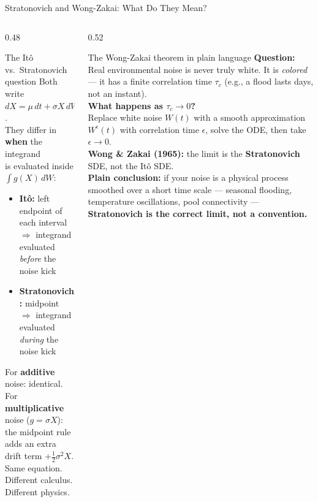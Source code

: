 \documentclass{beamer}
\newcommand{\half}{\tfrac{1}{2}}
\begin{document}
\begin{frame}{Stratonovich and Wong-Zakai: What Do They Mean?}
  \tiny

  \begin{columns}[T]

    \begin{column}{0.48\textwidth}
      \begin{block}{The It\^{o} vs.\ Stratonovich question}
        Both write $dX = \mu\,dt + \sigma X\,dW$.\\[6pt]
        They differ in \textbf{when} the integrand\\
        is evaluated inside $\int g(X)\,dW$:
        \begin{itemize}
          \item \textbf{It\^{o}:} left endpoint of each interval\\
                $\Rightarrow$ integrand evaluated \emph{before} the noise kick
          \item \textbf{Stratonovich:} midpoint\\
                $\Rightarrow$ integrand evaluated \emph{during} the noise kick
        \end{itemize}
        \vspace{0.2cm}
        For \textbf{additive} noise: identical.\\
        For \textbf{multiplicative} noise ($g = \sigma X$):\\
        the midpoint rule adds an extra drift term $+\half\sigma^2 X$.\\[4pt]
        \textcolor{alertred}{Same equation. Different calculus. Different physics.}
      \end{block}
    \end{column}

    \begin{column}{0.52\textwidth}
      \begin{block}{The Wong-Zakai theorem in plain language}
        \textbf{Question:} Real environmental noise is never
        truly white. It is \emph{colored} --- it has a
        finite correlation time $\tau_c$ (e.g., a flood
        lasts days, not an instant).\\[6pt]
        \textbf{What happens as $\tau_c \to 0$?}\\[4pt]
        Replace white noise $W(t)$ with a smooth
        approximation $W^\epsilon(t)$ with correlation
        time $\epsilon$, solve the ODE, then take
        $\epsilon \to 0$.\\[6pt]
        \textbf{Wong \& Zakai (1965):} the limit is the
        \textbf{Stratonovich} SDE, not the It\^{o} SDE.\\[6pt]
        \textbf{Plain conclusion:} if your noise is a
        physical process smoothed over a short time
        scale --- seasonal flooding, temperature
        oscillations, pool connectivity ---
        \textcolor{alertred}{\textbf{Stratonovich is the
        correct limit, not a convention.}}
      \end{block}
    \end{column}


\end{columns}
\end{frame}
\end{document}
